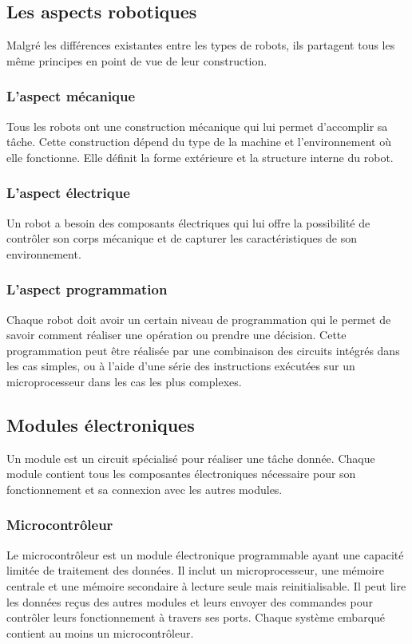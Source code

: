 \subsection{Les aspects robotiques}

Malgré les différences existantes entre les types de robots, ils partagent tous
les même principes en point de vue de leur construction.

\subsubsection{L'aspect mécanique}

Tous les robots ont une construction mécanique qui lui permet d'accomplir sa
tâche. Cette construction dépend du type de la machine et l'environnement où
elle fonctionne. Elle définit la forme extérieure et la structure interne du
robot.

\subsubsection{L'aspect électrique}

Un robot a besoin des composants électriques qui lui offre la possibilité de
contrôler son corps mécanique et de capturer les caractéristiques de son
environnement.

\subsubsection{L'aspect programmation}

Chaque robot doit avoir un certain niveau de programmation qui le permet de
savoir comment réaliser une opération ou prendre une décision. Cette
programmation peut être réalisée par une combinaison des circuits intégrés dans
les cas simples, ou à l'aide d'une série des instructions exécutées sur un
microprocesseur dans les cas les plus complexes.

\subsection{Modules électroniques}
Un module est un circuit spécialisé pour réaliser une tâche donnée. Chaque
module contient tous les composantes électroniques nécessaire pour son
fonctionnement et sa connexion avec les autres modules.

\subsubsection{Microcontrôleur}
Le microcontrôleur est un module électronique programmable ayant une capacité
limitée de traitement des données. Il inclut un microprocesseur, une mémoire
centrale et une mémoire secondaire à lecture seule mais reinitialisable.
Il peut lire les données reçus des autres modules et leurs envoyer des commandes
pour contrôler leurs fonctionnement à travers ses ports. Chaque système embarqué
contient au moins un microcontrôleur.

